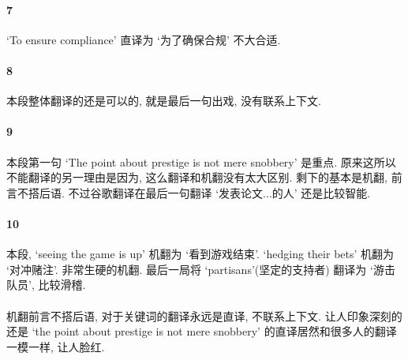\documentclass[a4paper, 12pt, UTF8]{article}
\begin{document}
\paragraph{7} `To ensure compliance' 直译为 `为了确保合规' 不大合适.
 
\paragraph{8} 本段整体翻译的还是可以的, 就是最后一句出戏, 没有联系上下文. 

\paragraph{9} 本段第一句 `The point about prestige is not mere snobbery' 是重点. 原来这所以不能翻译的另一理由是因为, 这么翻译和机翻没有太大区别. 剩下的基本是机翻, 前言不搭后语. 不过谷歌翻译在最后一句翻译 `发表论文...的人' 还是比较智能.

\paragraph{10} 本段, `seeing the game is up' 机翻为 `看到游戏结束'. `hedging their bets' 机翻为 `对冲赌注'. 非常生硬的机翻. 最后一局将 `partisans'(坚定的支持者) 翻译为 `游击队员', 比较滑稽. 

\paragraph{} 机翻前言不搭后语, 对于关键词的翻译永远是直译, 不联系上下文. 让人印象深刻的还是 `the point about prestige is not mere snobbery' 的直译居然和很多人的翻译一模一样, 让人脸红.
\end{document}
